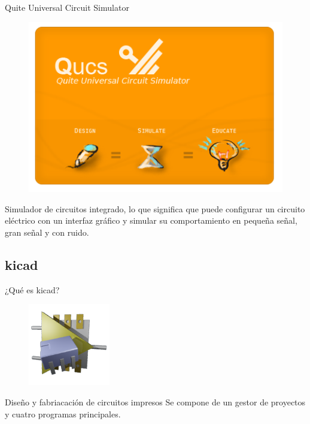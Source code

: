 \documentclass{beamer}
\begin{document}
\begin{frame}{Quite Universal Circuit Simulator}
  \begin{figure}
    \centering
    \includegraphics[scale=0.4]{qucs/img/qucslogo4.png}
  \end{figure}
  Simulador de circuitos integrado, lo que significa que puede configurar un circuito eléctrico con un interfaz gráfico y simular su comportamiento en pequeña señal, gran señal y con ruido.
\end{frame}

\subsection[kicad - \url{http://kicad.sourceforge.net}]{kicad}

\begin{frame}{¿Qué es kicad?}
  \begin{figure}[!h]
    \centering
    \includegraphics[scale=0.5]{img/kicad.png}
  \end{figure}
  Diseño y fabriacación de circuitos impresos
  Se compone de un gestor de proyectos y cuatro programas principales.
\end{frame}
\end{document}
